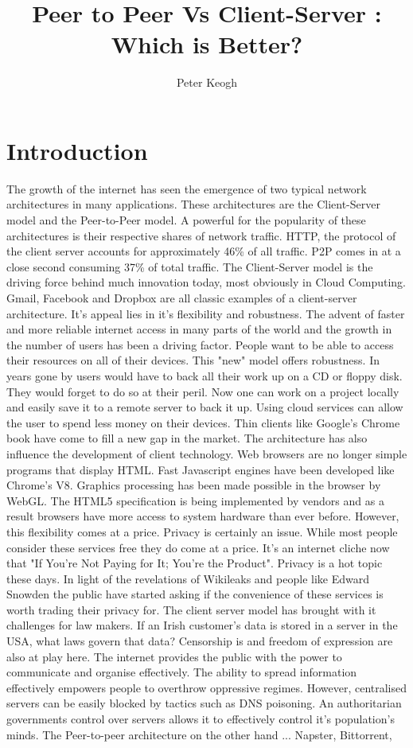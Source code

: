 \documentclass[12pt]{amsart}
\title{Peer to Peer Vs Client-Server : Which is Better?}
\author{Peter Keogh}
\date{}
\begin{document}
\maketitle
\tableofcontents

\section{Introduction}

The growth of the internet has seen the emergence of two typical network architectures in many applications. These architectures are the Client-Server model and the Peer-to-Peer model. A powerful for the popularity of these architectures is their respective shares of network traffic. HTTP, the protocol of the client server accounts for approximately 46\% of all traffic. P2P comes in at a close second consuming 37\% of total traffic.
The Client-Server model is the driving force behind much innovation today, most obviously in Cloud Computing. Gmail, Facebook and Dropbox are all classic examples of a client-server architecture. It's appeal lies in it's flexibility and robustness. The advent of faster and more reliable internet access in many parts of the world and the growth in the number of users has been a driving factor. People want to be able to access their resources on all of their devices. This "new" model offers robustness. In years gone by users would have to back all their work up on a CD or floppy disk. They would forget to do so at their peril. Now one can work on a project locally and easily save it to a remote server to back it up. 
Using cloud services can allow the user to spend less money on their devices. Thin clients like Google's Chrome book have come to fill a new gap in the market. 
The architecture has also influence the development of client technology. Web browsers are no longer simple programs that display HTML. Fast Javascript engines have been developed like Chrome's V8. Graphics processing has been made possible in the browser by WebGL. The HTML5 specification is being implemented by vendors and as a result browsers have more access to system hardware than ever before.
However, this flexibility comes at a price. Privacy is certainly an issue. While most people consider these services free they do come at a price. It's an internet cliche now that "If You're Not Paying for It; You're the Product". Privacy is a hot topic these days. In light of the revelations of Wikileaks and people like Edward Snowden the public have started asking if the convenience of these services is worth trading their privacy for. 
The client server model has brought with it challenges for law makers. If an Irish customer's data is stored in a server in the USA, what laws govern that data?
Censorship is and freedom of expression are also at play here. The internet provides the public with the power to communicate and organise effectively. The ability to spread information effectively empowers people to overthrow oppressive regimes. However, centralised servers can be easily blocked by tactics such as DNS poisoning. An authoritarian governments control over servers allows it to effectively control it's population's minds.
The Peer-to-peer architecture on the other hand ... Napster, Bittorrent, 
\end{document}
